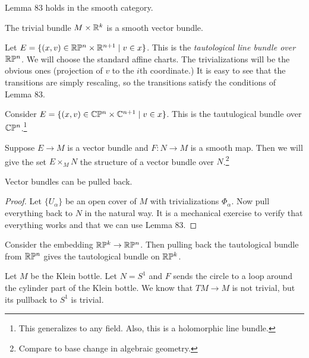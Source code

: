 \documentclass[twoside, 10pt]{article}
\begin{document}
    \begin{rmk}
        Lemma 83 holds in the smooth category.
    \end{rmk}

    \begin{exm}
        The trivial bundle $M \times \mathbb{R}^k$ is a smooth vector bundle.
    \end{exm}

    \begin{exm}
        Let $E = \{(x,v) \in \mathbb{R}\mathbb{P}^n \times \mathbb{R}^{n+1} \mid v \in x\}$. This is the \textit{tautological line bundle over $\mathbb{R}\mathbb{P}^n$.}
        We will choose the standard affine charts. The trivializations will be the obvious ones (projection of $v$ to the $i$th coordinate.) It is easy to see that the transitions are simply rescaling, so the transitions satisfy the conditions of Lemma 83.
    \end{exm}

    \begin{exm}
        Consider $E = \{(x,v) \in \mathbb{C}\mathbb{P}^n \times \mathbb{C}^{n+1} \mid v \in x\}$. This is the tautulogical bundle over $\mathbb{C}\mathbb{P}^n$.\footnote{This generalizes to any field. Also, this is a holomorphic line bundle.}
    \end{exm}

    Suppose $E \to M$ is a vector bundle and $F:N \to M$ is a smooth map. Then we will give the set $E \times_M N$ the structure of a vector bundle over $N$.\footnote{Compare to base change in algebraic geometry.}

    \begin{thm}
        Vector bundles can be pulled back.
    \end{thm}

    \begin{proof}
        Let $\{U_{\alpha}\}$ be an open cover of $M$ with trivializations $\Phi_{\alpha}$. Now pull everything back to $N$ in the natural way. It is a mechanical exercise to verify that everything works and that we can use Lemma 83.
    \end{proof}

    \begin{exm}
        Consider the embedding $\mathbb{R}\mathbb{P}^k \to \mathbb{R}\mathbb{P}^n$. Then pulling back the tautological bundle from $\mathbb{R}\mathbb{P}^n$ gives the tautological bundle on $\mathbb{R}\mathbb{P}^k$.
    \end{exm}

    \begin{exm}
        Let $M$ be the Klein bottle. Let $N = S^1$ and $F$ sends the circle to a loop around the cylinder part of the Klein bottle. We know that $TM \to M$ is not trivial, but its pullback to $S^1$ is trivial.
    \end{exm}
\end{document}
